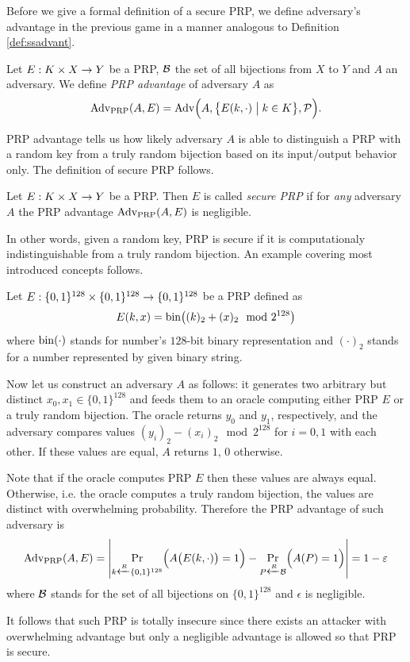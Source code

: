 Before we give a formal definition of a secure PRP, we define adversary's advantage in the previous game in a manner analogous to Definition \ref{def:ssadvant}.

\begin{defn}
\label{def:prpadvant}
	Let $E: K\times X\rightarrow Y$ be a PRP, $\cal B$ the set of all bijections from $X$ to $Y$ and $A$ an adversary. We define {\em PRP advantage} of adversary $A$ as
	\[
		\operatorname*{Adv_{PRP}}(A,E) = \operatorname*{Adv}\Bigl(A,\bigl\{E(k,\cdot)\bigm|k\in K\bigr\},{\cal P}\Bigr) .
	\]
\end{defn}

PRP advantage tells us how likely adversary $A$ is able to distinguish a PRP with a random key from a truly random bijection based on its input/output behavior only. The definition of secure PRP follows.

\begin{defn}
\label{def:secprp}
	Let $E: K\times X\rightarrow Y$ be a PRP. Then $E$ is called {\em secure PRP} if for {\em any} adversary $A$ the PRP advantage $\operatorname*{Adv_{PRP}}(A,E)$ is negligible.
\end{defn}

In other words, given a random key, PRP is secure if it is computationaly indistinguishable from a truly random bijection. An example covering most introduced concepts follows.

\begin{example}
	Let $E:\{0,1\}^{128}\times\{0,1\}^{128}\rightarrow\{0,1\}^{128}$ be a PRP defined as
	\[
		E(k,x) = \operatorname*{bin}\bigl((k)_2 + (x)_2 \mod{2^{128}}\bigr)
	\]
	where $\operatorname*{bin}(\cdot)$ stands for number's $128$-bit binary representation and $(\cdot)_2$ stands for a number represented by given binary string.
	
	Now let us construct an adversary $A$ as follows: it generates two arbitrary but distinct $x_0,x_1\in\{0,1\}^{128}$ and feeds them to an oracle computing either PRP $E$ or a truly random bijection. The oracle returns $y_0$ and $y_1$, respectively, and the adversary compares values $(y_i)_2 - (x_i)_2 \mod{2^{128}}$ for $i=0,1$ with each other. If these values are equal, $A$ returns $1$, $0$ otherwise.
	
	Note that if the oracle computes PRP $E$ then these values are always equal. Otherwise, i.e. the oracle computes a truly random bijection, the values are distinct with overwhelming probability. Therefore the PRP advantage of such adversary is
	\[
		\operatorname*{Adv_{PRP}}(A,E) = \left| \Pr\limits_{k\xleftarrow{R} \{0,1\}^{128}}\Bigl(A\bigl(E(k,\cdot)\bigr)=1\Bigr) - \Pr\limits_{P\xleftarrow{R} {\cal B}}\Bigl(A(P)=1\Bigr) \right| = 1 - \varepsilon
	\]
	where $\cal B$ stands for the set of all bijections on $\{0,1\}^{128}$ and $\epsilon$ is negligible.
	
	It follows that such PRP is totally insecure since there exists an attacker with overwhelming advantage but only a negligible advantage is allowed so that PRP is secure.
\end{example}

